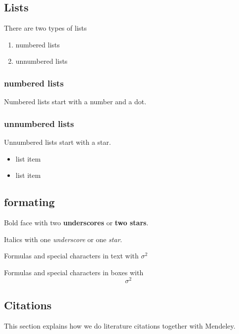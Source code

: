\documentclass[]{article}
\providecommand{\tightlist}{%
  \setlength{\itemsep}{0pt}\setlength{\parskip}{0pt}}
\begin{document}
\subsection{Lists}\label{lists}

There are two types of lists

\begin{enumerate}
\def\labelenumi{\arabic{enumi}.}
\tightlist
\item
  numbered lists
\item
  unnumbered lists
\end{enumerate}

\subsubsection{numbered lists}\label{numbered-lists}

Numbered lists start with a number and a dot.

\subsubsection{unnumbered lists}\label{unnumbered-lists}

Unnumbered lists start with a star.

\begin{itemize}
\tightlist
\item
  list item
\item
  list item
\end{itemize}

\subsection{formating}\label{formating}

Bold face with two \textbf{underscores} or \textbf{two stars}.

Italics with one \emph{underscore} or one \emph{star}.

Formulas and special characters in text with \(\sigma^2\)

Formulas and special characters in boxes with \[\sigma^2\]

\subsection{Citations}\label{citations}

This section explains how we do literature citations together with
Mendeley.
\end{document}

